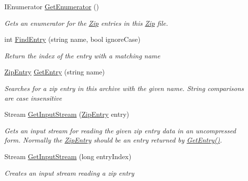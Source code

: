 \begin{DoxyCompactItemize}
I\+Enumerator \hyperlink{class_i_c_sharp_code_1_1_sharp_zip_lib_1_1_zip_1_1_zip_file_a4a317f7c7bc4e39a8622b2e588f8bf3c}{Get\+Enumerator} ()
\begin{DoxyCompactList}\small\item\em Gets an enumerator for the \hyperlink{namespace_i_c_sharp_code_1_1_sharp_zip_lib_1_1_zip}{Zip} entries in this \hyperlink{namespace_i_c_sharp_code_1_1_sharp_zip_lib_1_1_zip}{Zip} file. \end{DoxyCompactList}\item 
int \hyperlink{class_i_c_sharp_code_1_1_sharp_zip_lib_1_1_zip_1_1_zip_file_a9b10e39458ab994581e85cc47488c517}{Find\+Entry} (string name, bool ignore\+Case)
\begin{DoxyCompactList}\small\item\em Return the index of the entry with a matching name \end{DoxyCompactList}\item 
\hyperlink{class_i_c_sharp_code_1_1_sharp_zip_lib_1_1_zip_1_1_zip_entry}{Zip\+Entry} \hyperlink{class_i_c_sharp_code_1_1_sharp_zip_lib_1_1_zip_1_1_zip_file_a1d49a515fa629d36f64736581d84e3d8}{Get\+Entry} (string name)
\begin{DoxyCompactList}\small\item\em Searches for a zip entry in this archive with the given name. String comparisons are case insensitive \end{DoxyCompactList}\item 
Stream \hyperlink{class_i_c_sharp_code_1_1_sharp_zip_lib_1_1_zip_1_1_zip_file_a20e0fae7497b2540dbcedc5c27a0d772}{Get\+Input\+Stream} (\hyperlink{class_i_c_sharp_code_1_1_sharp_zip_lib_1_1_zip_1_1_zip_entry}{Zip\+Entry} entry)
\begin{DoxyCompactList}\small\item\em Gets an input stream for reading the given zip entry data in an uncompressed form. Normally the \hyperlink{class_i_c_sharp_code_1_1_sharp_zip_lib_1_1_zip_1_1_zip_entry}{Zip\+Entry} should be an entry returned by \hyperlink{class_i_c_sharp_code_1_1_sharp_zip_lib_1_1_zip_1_1_zip_file_a1d49a515fa629d36f64736581d84e3d8}{Get\+Entry()}. \end{DoxyCompactList}\item 
Stream \hyperlink{class_i_c_sharp_code_1_1_sharp_zip_lib_1_1_zip_1_1_zip_file_a49342918dbb019fef268576705e573d3}{Get\+Input\+Stream} (long entry\+Index)
\begin{DoxyCompactList}\small\item\em Creates an input stream reading a zip entry \end{DoxyCompactList}\item 

\end{DoxyCompactItemize}
